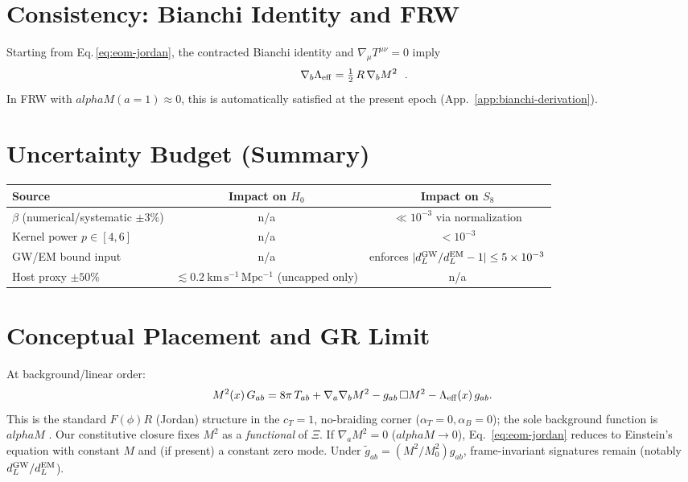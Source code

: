 \documentclass[aps,prd,onecolumn,superscriptaddress,nofootinbib]{revtex4-2}
\def\alphaM{alphaM}%
\def\boxed#1{#1}%
\newcommand{\alphaM}{\alpha_M}
\begin{document}
\section{Consistency: Bianchi Identity and FRW}
\label{sec:bianchi}
Starting from Eq.\,\eqref{eq:eom-jordan}, the contracted Bianchi identity and $\nabla_\mu T^{\mu\nu}=0$ imply
\begin{equation}
\boxed{\ \nabla_b \Lambda_{\rm eff} = \tfrac{1}{2}\,R\,\nabla_b M^2\ }\ .
\label{eq:bianchi-consistency}
\end{equation}
In FRW with $\alphaM(a{=}1)\approx 0$, this is automatically satisfied at the present epoch (App.~\ref{app:bianchi-derivation}).

\section{Uncertainty Budget (Summary)}
\label{sec:uncertainty}
\begin{center}
\begin{tabular}{l|c|c}
\hline
Source & Impact on $H_0$ & Impact on $S_8$ \\
\hline
$\beta$ (numerical/systematic $\pm 3\%$) & n/a & $\ll 10^{-3}$ via normalization \\
Kernel power $p\in[4,6]$ & n/a & $<10^{-3}$ \\
GW/EM bound input & n/a & enforces $|d_L^{\rm GW}/d_L^{\rm EM}-1|\le 5\times10^{-3}$ \\
Host proxy $\pm 50\%$ & $\lesssim 0.2\ \mathrm{km\,s^{-1}\,Mpc^{-1}}$ (uncapped only) & n/a \\
\hline
\end{tabular}
\end{center}

\section{Conceptual Placement and GR Limit}
\label{sec:GR-Horndeski}
At background/linear order:
\begin{equation}
\label{eq:eom-jordan}
M^2(x)\, G_{ab}
= 8\pi\, T_{ab}
+ \nabla_a\nabla_b M^2
- g_{ab}\,\Box M^2
- \Lambda_{\rm eff}(x)\, g_{ab}.
\end{equation}
This is the standard $F(\phi)R$ (Jordan) structure in the $c_T=1$, no-braiding corner ($\alpha_T=0,\alpha_B=0$); the sole background function is $\alphaM$ \cite{BelliniSawicki2014}. Our constitutive closure fixes $M^2$ as a \emph{functional} of $\Xi$. If $\nabla_a M^2=0$ ($\alphaM\to 0$), Eq.~\eqref{eq:eom-jordan} reduces to Einstein’s equation with constant $M$ and (if present) a constant zero mode. Under $\tilde g_{ab}=(M^2/M_0^2)g_{ab}$, frame-invariant signatures remain (notably $d_L^{\rm GW}/d_L^{\rm EM}$).
\end{document}
